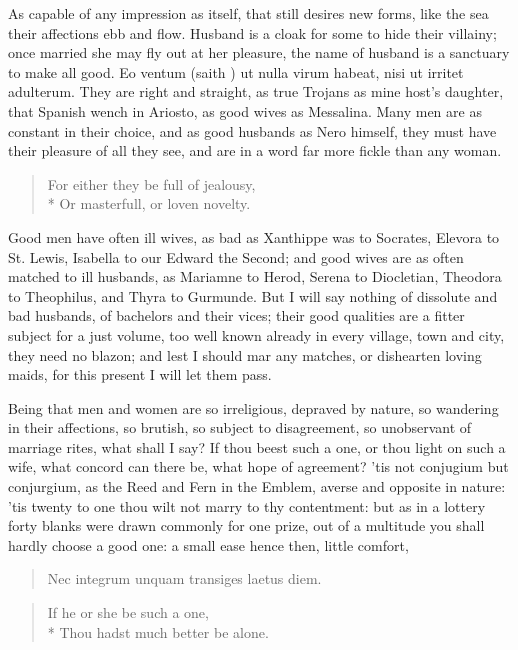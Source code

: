 As capable of any impression as  itself, that still
desires new forms, like the sea their affections ebb and flow. Husband
is a cloak for some to hide their villainy; once married she may fly
out at her pleasure, the name of husband is a sanctuary to make all
good. Eo ventum (saith \Seneca{}) ut nulla virum habeat, nisi ut irritet
adulterum. They are right and straight, as true Trojans as mine host's
daughter, that Spanish wench in Ariosto, as good wives as
Messalina. Many men are as constant in their choice, and as good
husbands as Nero himself, they must have their pleasure of all they
see, and are in a word far more fickle than any woman.

\begin{verse}
For either they be full of jealousy,\\*
Or masterfull, or loven novelty.
\end{verse}

Good men have often ill wives, as bad as Xanthippe was to Socrates,
Elevora to St. Lewis, Isabella to our Edward the Second; and good wives
are as often matched to ill husbands, as Mariamne to Herod, Serena to
Diocletian, Theodora to Theophilus, and Thyra to Gurmunde. But I will
say nothing of dissolute and bad husbands, of bachelors and their
vices; their good qualities are a fitter subject for a just volume, too
well known already in every village, town and city, they need no
blazon; and lest I should mar any matches, or dishearten loving maids,
for this present I will let them pass.

Being that men and women are so irreligious, depraved by nature, so
wandering in their affections, so brutish, so subject to disagreement,
so unobservant of marriage rites, what shall I say? If thou beest such
a one, or thou light on such a wife, what concord can there be, what
hope of agreement? 'tis not conjugium but conjurgium, as the Reed and
Fern in the Emblem, averse and opposite in nature: 'tis twenty to
one thou wilt not marry to thy contentment: but as in a lottery forty
blanks were drawn commonly for one prize, out of a multitude you shall
hardly choose a good one: a small ease hence then, little comfort,

\begin{latin}
\begin{verse}
Nec integrum unquam transiges laetus diem.
\end{verse}
\end{latin}
\translationrule%
\begin{verse}
If he or she be such a one,\\*
Thou hadst much better be alone.
\end{verse}

